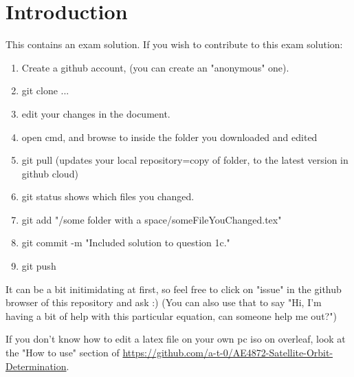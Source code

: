 \setcounter{section}{-1}
\section{Introduction}\label{sec:introduction}
This contains an exam solution. If you wish to contribute to this exam solution:
\begin{enumerate}
    \item Create a github account, (you can create an "anonymous" one).
    \item git clone ...
    \item edit your changes in the document.
    \item open cmd, and browse to inside the folder you downloaded and edited
    \item git pull (updates your local repository=copy of folder, to the latest version in github cloud)
    \item git status shows which files you changed.
    \item git add "/some folder with a space/someFileYouChanged.tex"
    \item git commit -m "Included solution to question 1c."
    \item git push
\end{enumerate}
It can be a bit initimidating at first, so feel free to click on "issue" in the github browser of this repository and ask :) (You can also use that to say "Hi, I'm having a bit of help with this particular equation, can someone help me out?")

If you don't know how to edit a latex file on your own pc iso on overleaf, look at the "How to use" section of \url{https://github.com/a-t-0/AE4872-Satellite-Orbit-Determination}.